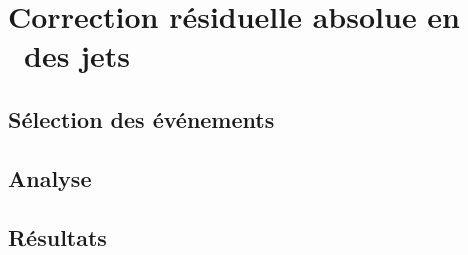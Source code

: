 \section{Correction résiduelle absolue en \pT\ des jets}\label{chapter-JERC-section-JES}

\subsection{Sélection des événements}\label{chapter-JERC-section-JES-subsec-evt_select}

\subsection{Analyse}\label{chapter-JERC-section-JES-subsec-analyse}

\subsection{Résultats}\label{chapter-JERC-section-JES-subsec-results}
